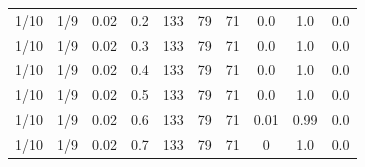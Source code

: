 \documentclass[specialist, substylefile = spbu.rtx,
			   subf, href, 12pt]{disser}
\begin{document}
\begin{table}[!hhh]
\begin{tabular}{cccccccccc}
		1/10 &      1/9 &       0.02 &    0.2 & 133 & 79 & 71 &    0.0 &    1.0 &    0.0 \\
		1/10 &      1/9 &       0.02 &    0.3 & 133 & 79 & 71 &    0.0 &    1.0 &    0.0 \\
		1/10 &      1/9 &       0.02 &    0.4 & 133 & 79 & 71 &    0.0 &    1.0 &    0.0 \\
		1/10 &      1/9 &       0.02 &    0.5 & 133 & 79 & 71 &    0.0 &    1.0 &    0.0 \\
		1/10 &      1/9 &       0.02 &    0.6 & 133 & 79 & 71 &   0.01 &   0.99 &    0.0 \\
		1/10 &      1/9 &       0.02 &    0.7 & 133 & 79 & 71 &      0 &    1.0 &    0.0 \\
		\bottomrule
	\end{tabular}
	\label{tab:simplified_system_results_k=30_2}
\end{table}
\end{document}
